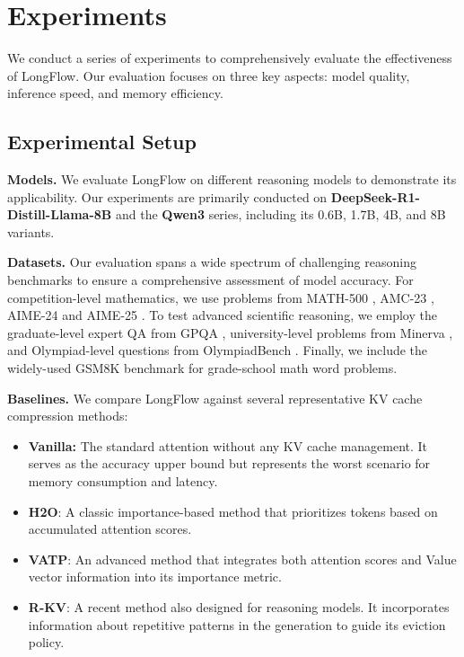 \section{Experiments}

We conduct a series of experiments to comprehensively evaluate the effectiveness of LongFlow. Our evaluation focuses on three key aspects: model quality, inference speed, and memory efficiency.





\subsection{Experimental Setup}
\label{sec:setup}
\noindent\textbf{Models.}
We evaluate LongFlow on different reasoning models to demonstrate its applicability.
Our experiments are primarily conducted on \textbf{DeepSeek-R1-Distill-Llama-8B} \citep{deepseekr1} and the \textbf{Qwen3} \citep{qwen3} series, including its 0.6B, 1.7B, 4B, and 8B variants.

\noindent\textbf{Datasets.}
Our evaluation spans a wide spectrum of challenging reasoning benchmarks to ensure a comprehensive assessment of model accuracy. For competition-level mathematics, we use problems from MATH-500 \citep{hendrycks2021measuring}, AMC-23 \citep{amc}, AIME-24 \citep{aime2024} and AIME-25 \citep{aime2025}. To test advanced scientific reasoning, we employ the graduate-level expert QA from GPQA \citep{rein2024gpqa}, university-level problems from Minerva \citep{lewkowycz2022solving}, and Olympiad-level questions from OlympiadBench \citep{he2024olympiadbench}. Finally, we include the widely-used GSM8K benchmark \citep{cobbe2021training} for grade-school math word problems.

\noindent\textbf{Baselines.}
We compare LongFlow against several representative KV cache compression methods:
\begin{itemize}[itemsep=0pt,topsep=0pt,parsep=0pt]
    \item \textbf{Vanilla:} The standard attention without any KV cache management. It serves as the accuracy upper bound but represents the worst scenario for memory consumption and latency.
    
    \item \textbf{H2O}\citep{h2o}: A classic importance-based method that prioritizes tokens based on accumulated attention scores.
    
    \item \textbf{VATP}\citep{vatp}: An advanced method that integrates both attention scores and Value vector information into its importance metric.
    
    \item \textbf{R-KV}\citep{rkv}: A recent method also designed for reasoning models. It incorporates information about repetitive patterns in the generation to guide its eviction policy.
\end{itemize}

